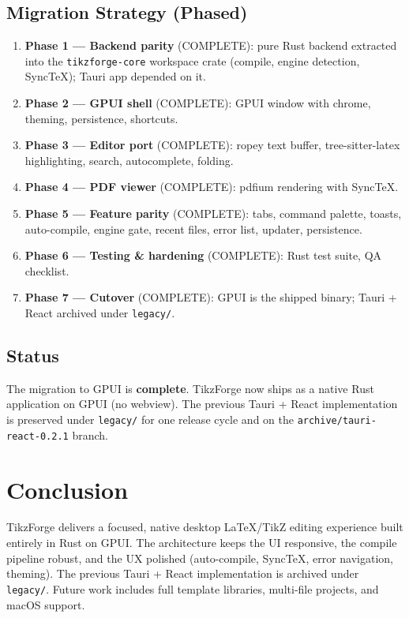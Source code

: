 \documentclass[11pt,a4paper]{report}
\begin{document}
\section{Migration Strategy (Phased)}
\begin{enumerate}
  \item \textbf{Phase 1 — Backend parity} (COMPLETE): pure Rust backend extracted into the \texttt{tikzforge-core} workspace crate (compile, engine detection, SyncTeX); Tauri app depended on it.
  \item \textbf{Phase 2 — GPUI shell} (COMPLETE): GPUI window with chrome, theming, persistence, shortcuts.
  \item \textbf{Phase 3 — Editor port} (COMPLETE): ropey text buffer, tree-sitter-latex highlighting, search, autocomplete, folding.
  \item \textbf{Phase 4 — PDF viewer} (COMPLETE): pdfium rendering with SyncTeX.
  \item \textbf{Phase 5 — Feature parity} (COMPLETE): tabs, command palette, toasts, auto-compile, engine gate, recent files, error list, updater, persistence.
  \item \textbf{Phase 6 — Testing \& hardening} (COMPLETE): Rust test suite, QA checklist.
  \item \textbf{Phase 7 — Cutover} (COMPLETE): GPUI is the shipped binary; Tauri + React archived under \texttt{legacy/}.
\end{enumerate}

\section{Status}
The migration to GPUI is \textbf{complete}. TikzForge now ships as a native Rust application on GPUI (no webview). The previous Tauri + React implementation is preserved under \texttt{legacy/} for one release cycle and on the \texttt{archive/tauri-react-0.2.1} branch.

\chapter{Conclusion}

TikzForge delivers a focused, native desktop LaTeX/TikZ editing experience built entirely in Rust on GPUI. The architecture keeps the UI responsive, the compile pipeline robust, and the UX polished (auto-compile, SyncTeX, error navigation, theming). The previous Tauri + React implementation is archived under \texttt{legacy/}. Future work includes full template libraries, multi-file projects, and macOS support.
\end{document}
